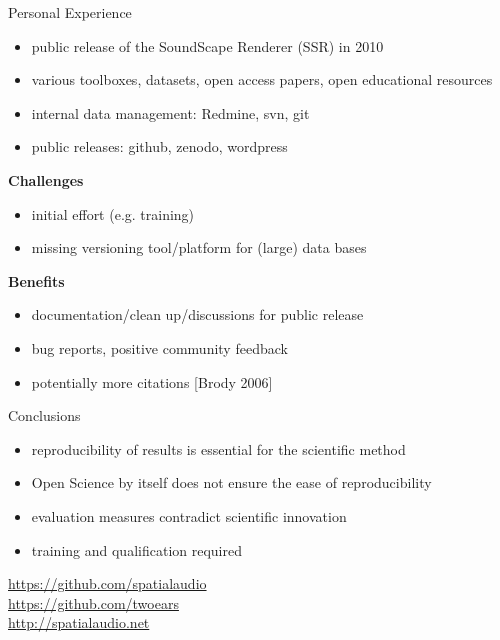 \documentclass{intbeamer}
\begin{document}
\begin{frame}{Personal Experience}

\begin{itemize}
\item public release of the SoundScape Renderer (SSR) in 2010
\item various toolboxes, datasets, open access papers, open educational resources
\item internal data management: Redmine, svn, git
\item public releases: github, zenodo, wordpress
\end{itemize}

\vfill

\textbf{Challenges}
\begin{itemize}
\item initial effort (e.g. training)
\item missing versioning tool/platform for (large) data bases
\end{itemize}

\vfill

\textbf{Benefits}
\begin{itemize}
\item documentation/clean up/discussions for public release
\item bug reports, positive community feedback
\item potentially more citations {\tiny [Brody 2006]}
\end{itemize}

\end{frame}


\begin{frame}{Conclusions}

\begin{itemize}
\item reproducibility of results is essential for the scientific method
\item Open Science by itself does not ensure the ease of reproducibility
\item evaluation measures contradict scientific innovation
\item training and qualification required
\end{itemize}

\vfill

{\large
\url{https://github.com/spatialaudio}\\[1ex]
\url{https://github.com/twoears}\\[1ex]
\url{http://spatialaudio.net}
}

\end{frame}
\end{document}
